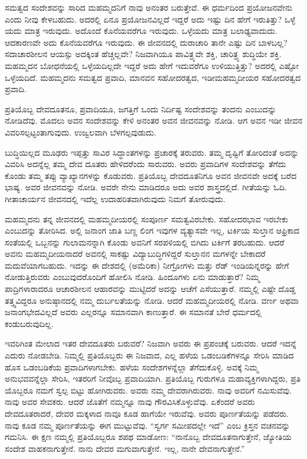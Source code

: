 ಸಮತ್ವದ ಸಂದೇಶವನ್ನು ಸಾರಿದ ಮಹಮ್ಮದನಿಗೆ ನಾವು ಅನಂತರ ಬರುತ್ತೇವೆ. ಈ ಧರ್ಮದಿಂದ ಪ್ರಯೋಜನವೇನು ಎಂದು ನೀವು ಕೇಳಬಹುದು. ಅದರಲ್ಲಿ ಏನೂ ಪ್ರಯೋಜನವಿಲ್ಲದೆ ಇದ್ದರೆ ಅದು ಇಷ್ಟು ದಿನ ಹೇಗೆ ಇರುತಿತ್ತು? ಒಳ್ಳೆ ಯದು ಮಾತ್ರ ಇರುವುದು. ಅದೊಂದೆ ಕೊನೆಯವರೆಗೂ ಇರುವುದು. ಒಳ್ಳೆಯದು ಮಾತ್ರ ಬಲಾಢ್ಯ\break ವಾದುದು. ಆದಕಾರಣವೇ ಅದು ಕೊನೆಯವರೆಗೂ ಇರುವುದು. ಈ ಜೀವನದಲ್ಲಿ ದುರಾಚಾರಿ ತಾನೇ ಎಷ್ಟು ದಿನ ಬಾಳಬಲ್ಲ? ಸದಾಚಾರಶೀಲನ ಆಯಸ್ಸು ಅದಕ್ಕಿಂತ ಹೆಚ್ಚಲ್ಲವೇ? ನಿಜವಾಗಿಯೂ ಪಾವಿತ್ರ್ಯವೇ ಶಕ್ತಿ, ಚಾರಿತ್ರ್ಯ ಶುದ್ಧಿಯೇ ಶಕ್ತಿ. ಮಹಮ್ಮದನ ಬೋಧನೆಯಲ್ಲಿ ಒಳ್ಳೆಯದಿಲ್ಲದೇ ಇದ್ದರೆ ಅದು ಹೇಗೆ ಇದುವರೆಗೂ ಉಳಿಯುತ್ತಿತ್ತು? ಅದರಲ್ಲಿ ಎಷ್ಟೋ ಒಳ್ಳೆಯದಿದೆ. ಮಹಮ್ಮದನು ಸಮತ್ವದ ಪ್ರವಾದಿ, ಮಾನವನ ಸಹೋದರತ್ವದ, ಇಡೀ\break ಮಹಮ್ಮದೀಯರ ಸಹೋದರತ್ವದ ಪ್ರವಾದಿ.

ಪ್ರತಿಯೊಬ್ಬ ದೇವದೂತನೂ, ಪ್ರವಾದಿಯೂ, ಜಗತ್ತಿಗೆ ಒಂದು ನಿರ್ದಿಷ್ಟ ಸಂದೇಶವನ್ನು ತಂದನು ಎಂಬುದನ್ನು ನೋಡಿದೆವು. ಮೊದಲು ಅವನ ಸಂದೇಶವನ್ನು ಕೇಳಿ ಅನಂತರ ಅವನ ಜೀವನವನ್ನು ನೋಡಿ. ಆಗ ಅವನ ಇಡೀ ಜೀವನ ವಿವರಿಸಲ್ಪಟ್ಟಂತಾಗುವುದು. ಉಜ್ವಲವಾಗಿ ಬೆಳಗಲ್ಪವುಡುದು.

ಬುದ್ಧಿಯಿಲ್ಲದ ಮೂಢರು ಇಪ್ಪತ್ತು ಸಾವಿರ ಸಿದ್ಧಾಂತಗಳನ್ನು ಪ್ರಚಾರಕ್ಕೆ ತರುವರು. ತಮ್ಮ ದೃಷ್ಟಿಗೆ ತೋರಿದಂತೆ ಅದನ್ನು ವಿವರಿಸಿ ಅದನ್ನೆಲ್ಲ ತಮ್ಮ ದೇವ ದೂತರು ಹೇಳಿದರೆಂದು ಸಾರುವರು. ಅವರು ಪ್ರವಾದಿಗಳ ಸಂದೇಶವನ್ನು ತೆಗೆದು ಕೊಂಡು ತಮ್ಮ ತಪ್ಪು ವ್ಯಾಖ್ಯಾನಗಳನ್ನು ಕೊಡುವರು. ಪ್ರತಿಯೊಬ್ಬ ದೇವದೂತನಿಗೂ ಅವನ ಜೀವನವೇ ಅದಕ್ಕೆ ಬರೆದ ಭಾಷ್ಯ. ಅವರ ಜೀವನವನ್ನು ನೋಡಿ. ಅವರೇ ನೇನು ಮಾಡಿದರೂ ಅದು ಅವರ ಶಾಸ್ತ್ರದಲ್ಲಿದೆ. ಗೀತೆಯನ್ನು ಓದಿ. ಗೀತಾಚಾರ್ಯನ ಜೀವನದಲ್ಲಿ ಇದೆಲ್ಲ ಉದಾಹರಿತ\-ವಾಗಿರುವುದು ನಿಮಗೆ ತೋರುವುದು.

ಮಹಮ್ಮದನು ತನ್ನ ಜೀವನದಲ್ಲಿ ಮಹಮ್ಮದೀಯರಲ್ಲಿ ಸಂಪೂರ್ಣ ಸಮತ್ವವಿರಬೇಕು. ಸಹೋದರಭಾವ ಇರಬೇಕು ಎಂಬುದನ್ನು ತೋರಿಸಿದ. ಅಲ್ಲಿ ಜನಾಂಗ ಜಾತಿ ಬಣ್ಣ ಲಿಂಗ ಇವುಗಳ ವ್ಯತ್ಯಾಸವೇ ಇಲ್ಲ, ಟರ್ಕಿಯ ಸುಲ್ತಾನ ಆಫ್ರಿಕಾದ ಸಂತೆಯಲ್ಲಿ ಒಬ್ಬನನ್ನು ಗುಲಾಮನನ್ನಾಗಿ ಕೊಂಡು ಅವನಿಗೆ ಸರಪಳಿಯಲ್ಲಿ ಬಿಗಿದು ಟರ್ಕಿಗೆ ತರಬಹುದು. ಆದರೆ ಅವನು ಮಹಮ್ಮದೀಯನಾದರೆ ಅವನಲ್ಲಿ ಸಾಕಷ್ಟು ವಿದ್ಯಾಬುದ್ಧಿಗಳಿದ್ದರೆ ಸುಲ್ತಾನನ ಮಗಳನ್ನೇ ಬೇಕಾದರೆ ಮದುವೆಯಾಗಬಹುದು. ಇದನ್ನು ಈ ದೇಶದಲ್ಲಿ (ಅಮೆರಿಕಾ) ನೀಗ್ರೋಗಳು ಮತ್ತು ರೆಡ್​ ಇಂಡಿಯನ್ನರನ್ನು ಹೇಗೆ ನೋಡುತ್ತಿರುವರು ಎಂಬುವುದರೊಂದಿಗೆ ಹೋಲಿಸಿ ನೋಡಿ. ಹಿಂದೂಗಳು ಏನು ಮಾಡುತ್ತಾರೆ? ನಿಮ್ಮ ಪಾದ್ರಿಗಳಾರಾದರೂ ಆಚಾರಶೀಲನ ಆಹಾರವನ್ನು ಮುಟ್ಟಿದರೆ ಅದನ್ನು ಆಚೆಗೆ ಎಸೆಯುತ್ತಾರೆ. ನಮ್ಮಲ್ಲಿ ಎಷ್ಟೇ ದೊಡ್ಡ ತತ್ತ್ವವಿದ್ದರೂ ಅನುಷ್ಠಾನದಲ್ಲಿ ನಮ್ಮ ದುರ್ಬಲತೆಯನ್ನು ನೋಡಿ. ಆದರೆ ಮಹಮ್ಮದೀಯರಲ್ಲಿ ನೋಡಿ. ವರ್ಣ ಅಥವಾ ಜನಾಂಗಭೇದವಿಲ್ಲದೆ ಅವರು ಎಲ್ಲರನ್ನೂ ಸಮಾನವಾಗಿ ಕಾಣುತ್ತಾರೆ. ಈ ಸಮಾನತೆ ಬೇರೆ ಧರ್ಮದಲ್ಲಿ ಕಂಡುಬರುವುದಿಲ್ಲ.

ಇವರಿಗಿಂತ ಮೇಲಾದ ಇತರ ದೇವದೂತರು ಬರುವರೆ? ನಿಜವಾಗಿ ಅವರು ಈ ಪ್ರಪಂಚಕ್ಕೆ ಬರುವರು. ಆದರೆ ಇದನ್ನೆ ಎದುರು ನೋಡಬೇಡಿ. ನಿಮ್ಮಲ್ಲಿ ಪ್ರತಿಯೊಬ್ಬರು ಈ ನಿಜವಾದ, ಎಲ್ಲ ಹಳೆಯ ಒಡಂಬಡಿಕೆಗಳನ್ನೂ ಸೇರಿಸಿ ಮಾಡಿದ ಹೊಸ ಒಡಂ\-ಬಡಿಕೆಯ ಪ್ರವಾದಿಗಳಾಗಬೇಕು. ಹಳೆಯ ಸಂದೇಶಗಳನ್ನೆಲ್ಲಾ ತೆಗೆದುಕೊಳ್ಳಿ. ಅವಕ್ಕೆ ನಿಮ್ಮ ಅನುಭವವನ್ನೆಲ್ಲಾ ಸೇರಿಸಿ, ಇತರರಿಗೆ ನೀವೊಬ್ಬ ಪ್ರವಾದಿಯಾಗಿ. ಪ್ರತಿಯೊಬ್ಬ ಗುರುಗಳೂ ಮಹಾವ್ಯಕ್ತಿಗಳಾಗಿದ್ದರು, ಪ್ರತಿ ಯೊಬ್ಬರೂ ನಮಗೆ ಸ್ವಲ್ಪ ಬಿಟ್ಟು ಹೋಗಿರುವರು. ಅವರು ನಮ್ಮ ದೇವರಾಗಿರುವರು. ನಾವು ಅವರಿಗೆ ನಮಿಸುವೆವು. ನಾವು ಅವರ ಸೇವಕರು. ಆದರೆ ಜೊತೆಗೆ ನಮ್ಮನ್ನೂ ನಾವು ಗೌರವಿಸಿಕೊಳ್ಳುವೆವು. ಏಕೆಂದರೆ ಅವರು ದೇವದೂತರಾದರೆ, ದೇವರ ಮಕ್ಕಳಾದ ನಾವೂ ಕೂಡ ಹಾಗೆಯೇ ಇರುವೆವು. ಅವರು ಪೂರ್ಣತೆಯನ್ನು ಪಡೆದರು. ನಾವು ಕೂಡ ನಮ್ಮ ಪೂರ್ಣತೆಯನ್ನು ಈಗ ಮುಟ್ಟುವೆವು. “ಸ್ವರ್ಗ ಸಮೀಪದಲ್ಲೇ ಇದೆ” ಎಂಬ ಕ್ರಿಸ್ತನ ವಚನವನ್ನು ಗಮನಿಸಿ. ಈ ಕ್ಷಣ ನಮ್ಮಲ್ಲಿ ಪ್ರತಿಯೊಬ್ಬರೂ ಶಪಥ ಮಾಡೋಣ: “ನಾನೊಬ್ಬ ದೇವದೂತನಾಗುತ್ತೇನೆ, ಜ್ಯೋತಿಯ ಸಂದೇಶ ವಾಹಕನಾಗುತ್ತೇನೆ. ನಾನು ದೇವರ ಮಗುವಾಗುತ್ತೇನೆ. ಇಲ್ಲ, ನಾನೇ ದೇವನಾಗುತ್ತೇನೆ.”

